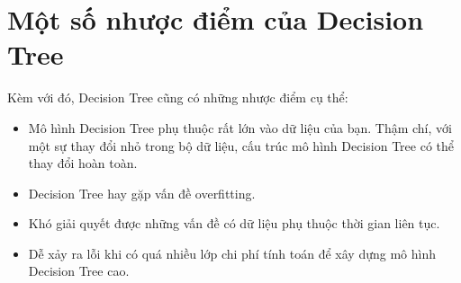 \section{Một số nhược điểm của Decision Tree}
Kèm với đó, Decision Tree cũng có những nhược điểm cụ thể:

\begin{itemize}
    \item Mô hình Decision Tree phụ thuộc rất lớn vào dữ liệu
    của bạn. Thậm chí, với một sự thay đổi nhỏ trong bộ dữ liệu,
    cấu trúc mô hình Decision Tree có thể thay đổi hoàn toàn.
    \item Decision Tree hay gặp vấn đề overfitting.
    \item Khó giải quyết được những vấn đề có dữ liệu phụ thuộc thời gian liên tục.
    \item Dễ xảy ra lỗi khi có quá nhiều lớp chi phí tính toán để
    xây dựng mô hình Decision Tree cao.
\end{itemize}
